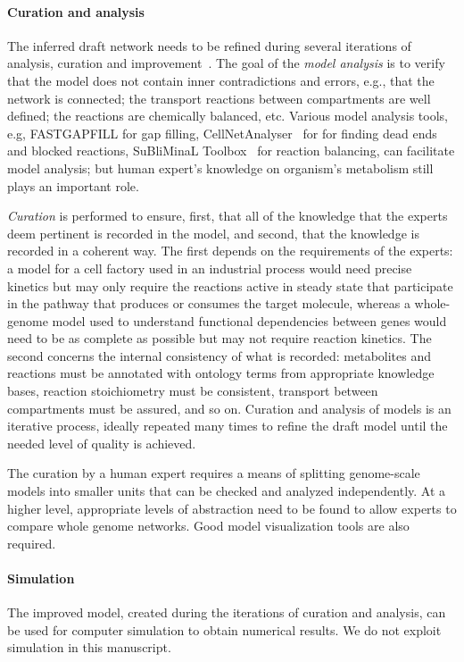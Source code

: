 \documentclass{bmcart}
\begin{document}
\paragraph{Curation and analysis}
The inferred draft network needs to be refined during several iterations of analysis, curation and improvement~\cite{Thiele2010,Swainston2011}. The goal of the \emph{model analysis} is to verify that the model does not contain inner contradictions and errors, e.g., that the network is connected; the transport reactions between compartments are well defined; the reactions are chemically balanced, etc. Various model analysis tools, e.g, FASTGAPFILL \cite{Thiele2014} for gap filling, CellNetAnalyser~\cite{Klamt07} for for finding dead ends and blocked reactions, SuBliMinaL Toolbox~\cite{Swainston2011} for reaction balancing, can facilitate model analysis; but human expert's knowledge on organism's metabolism still plays an important role.

\emph{Curation} is performed to ensure, first, that all of the knowledge that the experts
deem pertinent is recorded in the model, and second, that the knowledge is recorded in a
coherent way.
The first depends on the requirements of the experts: a model for a cell factory used in
an industrial process would need precise kinetics but may only require the reactions
active in steady state that participate in the pathway that produces or consumes the
target molecule, whereas a whole-genome model used to understand functional dependencies
between genes would need to be as complete as possible but may not require reaction kinetics.
The second concerns the internal consistency of what is recorded: metabolites and
reactions must be annotated with ontology terms from appropriate knowledge bases, 
reaction stoichiometry must be consistent, transport between compartments must be assured,
and so on.
Curation and analysis of models is an iterative process, ideally repeated many times to
refine the draft model until the needed level of quality is achieved.

The curation by a human expert requires a means of splitting genome-scale models into smaller units that can be checked and analyzed independently. At a higher level, appropriate levels of abstraction need to be found to allow experts to compare whole genome networks. Good model visualization tools are also required.

\paragraph{Simulation}
The improved model, created during the iterations of curation and analysis, %
can be used for computer simulation to obtain numerical results. We do not exploit simulation in this manuscript.
\end{document}
